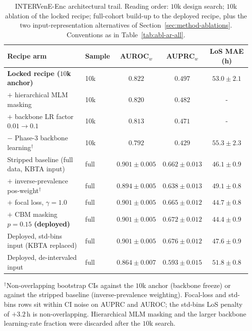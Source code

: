 \begin{table}[htbp]
\caption{INTERVenE-Enc architectural trail. Reading order: $10$k design search; $10$k ablation of the locked recipe; full-cohort build-up to the deployed recipe, plus the two input-representation alternatives of Section~\ref{sec:method-ablations}. Conventions as in Table~\ref{tab:abl-ar-all}.}
\label{tab:abl-enc-all}
\centering
\singlespacing
\small
\setlength{\tabcolsep}{4pt}
\begin{tabular}{llccc}
\toprule
Recipe arm & Sample & AUROC$_w$ & AUPRC$_w$ & LoS MAE (h) \\
\midrule
\textbf{Locked recipe ($10$k anchor)}                    & 10k  & $\mathbf{0.822}$  & $\mathbf{0.497}$  & $53.0 \pm 2.1$ \\
\quad $+$ hierarchical MLM masking                       & 10k  & $0.820$           & $0.482$           & - \\
\quad $+$ backbone LR factor $0.01 \to 0.1$              & 10k  & $0.813$           & $0.471$           & - \\
\quad $-$ Phase-3 backbone learning$^\dagger$            & 10k  & $0.792$           & $0.429$           & $55.3 \pm 2.3$ \\
\midrule
Stripped baseline (full data, KBTA input)                & full & $0.901 \pm 0.005$ & $0.662 \pm 0.013$ & $46.1 \pm 0.9$ \\
\quad $+$ inverse-prevalence pos-weight$^\dagger$        & full & $0.894 \pm 0.005$ & $0.638 \pm 0.013$ & $49.1 \pm 0.8$ \\
\quad $+$ focal loss, $\gamma{=}1.0$                     & full & $0.901 \pm 0.005$ & $0.665 \pm 0.012$ & $44.7 \pm 0.8$ \\
\quad $+$ CBM masking $p{=}0.15$ \textbf{(deployed)}     & full & $\mathbf{0.901 \pm 0.005}$ & $\mathbf{0.672 \pm 0.012}$ & $\mathbf{44.4 \pm 0.9}$ \\
\midrule
Deployed, std-bins input (KBTA replaced)                 & full & $0.901 \pm 0.005$ & $0.676 \pm 0.012$ & $47.6 \pm 0.9$ \\
Deployed, de-intervaled input                            & full & $0.864 \pm 0.007$ & $0.593 \pm 0.015$ & $51.8 \pm 0.8$ \\
\bottomrule
\end{tabular}

\smallskip
\footnotesize $^\dagger$Non-overlapping bootstrap CIs against the $10$k anchor (backbone freeze) or against the stripped baseline (inverse-prevalence weighting). Focal-loss and std-bins rows sit within CI noise on AUPRC and AUROC; the std-bins LoS penalty of $+3.2$\,h is non-overlapping. Hierarchical MLM masking and the larger backbone learning-rate fraction were discarded after the $10$k search.
\end{table}

